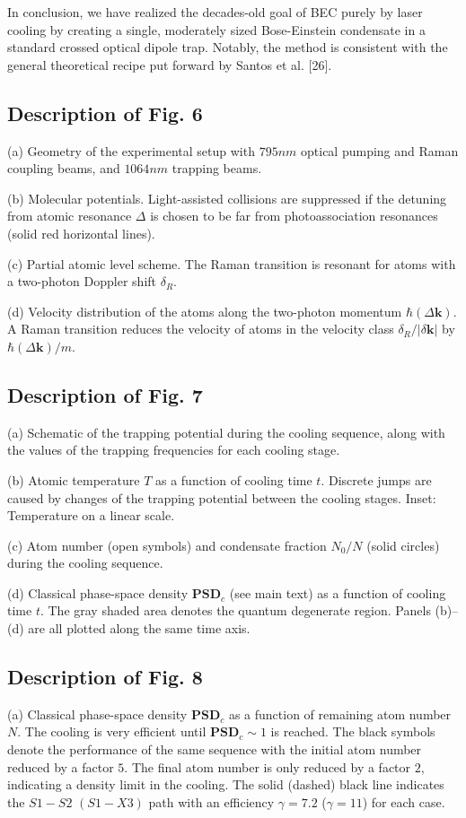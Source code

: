 \documentclass{article}
\begin{document}
In conclusion, we have realized the decades-old goal of BEC purely by laser cooling by creating a single, moderately sized Bose-Einstein condensate in a standard crossed optical dipole trap. Notably, the method is consistent with the general theoretical recipe put forward by Santos et al. [26].

\subsection{Description of Fig. 6}
(a) Geometry of the experimental setup with $795 nm$ optical pumping and Raman coupling beams, and $1064 nm$ trapping beams. 

(b) Molecular potentials. Light-assisted collisions are suppressed if the detuning from atomic resonance $\Delta$ is chosen to be far from photoassociation resonances (solid red horizontal lines). 

(c) Partial atomic level scheme. The Raman transition is resonant for atoms with a two-photon Doppler shift $\delta_R$. 

(d) Velocity distribution of the atoms along the two-photon momentum $\hbar (\Delta \mathbf{k})$. A Raman transition reduces the velocity of atoms in the velocity class $\delta_R / | \delta \mathbf{k} |$ by $\hbar(\Delta \mathbf{k})/m$.

\subsection{Description of Fig. 7}
(a) Schematic of the trapping potential during the cooling sequence, along with the values of the trapping frequencies for each cooling stage. 

(b) Atomic temperature $T$ as a function of cooling time $t$. Discrete jumps are caused by changes of the trapping potential between the cooling stages. Inset: Temperature on a linear scale. 

(c) Atom number (open symbols) and condensate fraction $N_0/N$ (solid circles) during the cooling sequence. 

(d) Classical phase-space density $\mathbf{PSD}_c$ (see main text) as a function of cooling time $t$. The gray shaded area denotes the quantum degenerate region. Panels (b)–(d) are all plotted along the same time axis.

\subsection{Description of Fig. 8}
(a) Classical phase-space density $\mathbf{PSD}_c$ as a function of remaining atom number $N$. The cooling is very efficient until $\mathbf{PSD}_c \sim 1$ is reached. The black symbols denote the performance of the same sequence with the initial atom number reduced by a factor $5$. The final atom number is only reduced by a factor $2$, indicating a density limit in the cooling. The solid (dashed) black line indicates the $S1-S2$ $(S1-X3)$ path with an efficiency $\gamma = 7.2$ ($\gamma = 11$) for each case. 
\end{document}
